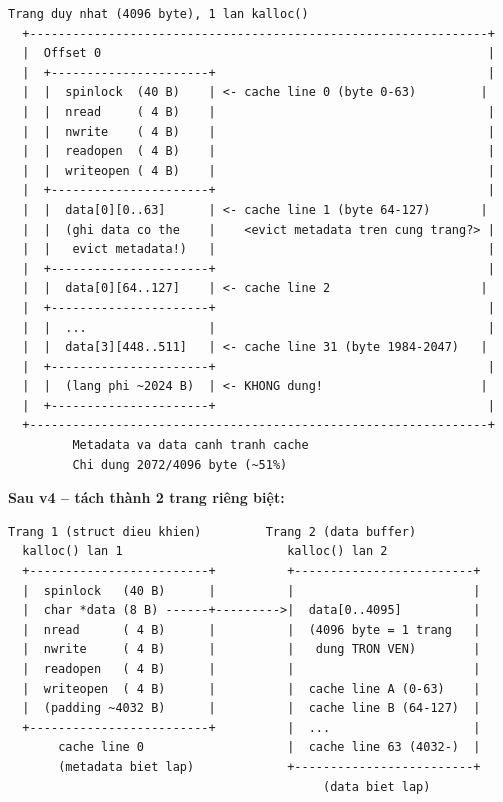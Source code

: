 \documentclass[11pt,a4paper]{article}
\begin{document}
\begin{lstlisting}[style=plain]
  Trang duy nhat (4096 byte), 1 lan kalloc()
  +----------------------------------------------------------------+
  |  Offset 0                                                      |
  |  +----------------------+                                      |
  |  |  spinlock  (40 B)    | <- cache line 0 (byte 0-63)         |
  |  |  nread     ( 4 B)    |                                      |
  |  |  nwrite    ( 4 B)    |                                      |
  |  |  readopen  ( 4 B)    |                                      |
  |  |  writeopen ( 4 B)    |                                      |
  |  +----------------------+                                      |
  |  |  data[0][0..63]      | <- cache line 1 (byte 64-127)       |
  |  |  (ghi data co the    |    <evict metadata tren cung trang?> |
  |  |   evict metadata!)   |                                      |
  |  +----------------------+                                      |
  |  |  data[0][64..127]    | <- cache line 2                     |
  |  +----------------------+                                      |
  |  |  ...                 |                                      |
  |  |  data[3][448..511]   | <- cache line 31 (byte 1984-2047)   |
  |  +----------------------+                                      |
  |  |  (lang phi ~2024 B)  | <- KHONG dung!                      |
  |  +----------------------+                                      |
  +----------------------------------------------------------------+
         Metadata va data canh tranh cache
         Chi dung 2072/4096 byte (~51%)
\end{lstlisting}

\textbf{Sau v4 -- tách thành 2 trang riêng biệt:}

\begin{lstlisting}[style=plain]
  Trang 1 (struct dieu khien)         Trang 2 (data buffer)
  kalloc() lan 1                       kalloc() lan 2
  +-------------------------+          +-------------------------+
  |  spinlock   (40 B)      |          |                         |
  |  char *data (8 B) ------+--------->|  data[0..4095]          |
  |  nread      ( 4 B)      |          |  (4096 byte = 1 trang   |
  |  nwrite     ( 4 B)      |          |   dung TRON VEN)        |
  |  readopen   ( 4 B)      |          |                         |
  |  writeopen  ( 4 B)      |          |  cache line A (0-63)    |
  |  (padding ~4032 B)      |          |  cache line B (64-127)  |
  +-------------------------+          |  ...                    |
       cache line 0                    |  cache line 63 (4032-)  |
       (metadata biet lap)             +-------------------------+
                                            (data biet lap)
\end{lstlisting}
\end{document}
